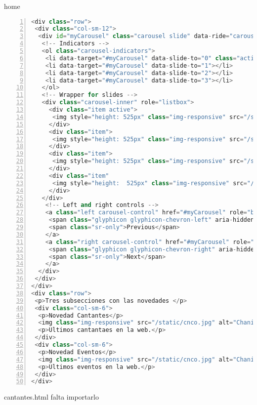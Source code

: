 home
\begin{lstlisting}[framerule=0pt,
aboveskip=0.5cm,
framextopmargin=3pt,
framexbottommargin=3pt,
framexleftmargin=0.4cm,
framesep=0pt,
rulesep=.4pt,
numbers=left,
numbersep=15pt,
numberstyle=\tiny,
numberfirstline = false,
breaklines=true,
frame=single,
stringstyle=\ttfamily,
showstringspaces = false,
basicstyle=\small\ttfamily,
keywordstyle=\bfseries,
rulesepcolor=\color{black},
captionpos=b,
language=Python,
caption=Home formato HTML.]
<div class="row">
 <div class="col-sm-12">
  <div id="myCarousel" class="carousel slide" data-ride="carousel">
   <!-- Indicators -->
   <ol class="carousel-indicators">
    <li data-target="#myCarousel" data-slide-to="0" class="active"></li>
    <li data-target="#myCarousel" data-slide-to="1"></li>
    <li data-target="#myCarousel" data-slide-to="2"></li>
    <li data-target="#myCarousel" data-slide-to="3"></li>
   </ol>
   <!-- Wrapper for slides -->
   <div class="carousel-inner" role="listbox">
     <div class="item active">
      <img style="height: 525px" class="img-responsive" src="/static/chris.jpg" alt="Chania">
     </div>
     <div class="item">
      <img style="height: 525px" class="img-responsive" src="/static/cnco.jpg" alt="Chania">
     </div>
     <div class="item">
      <img style="height: 525px" class="img-responsive" src="/static/DREAMBEACH.jpg" alt="Flower">
     </div>
     <div class="item"
      <img style="height:  525px" class="img-responsive" src="/static/ultra-music-festival.jpg" alt="Flower">
     </div>
   </div>
  	<!-- Left and right controls -->
    <a class="left carousel-control" href="#myCarousel" role="button" data-slide="prev">
     <span class="glyphicon glyphicon-chevron-left" aria-hidden="true"></span>
     <span class="sr-only">Previous</span>
    </a>
    <a class="right carousel-control" href="#myCarousel" role="button" data-slide="next">
     <span class="glyphicon glyphicon-chevron-right" aria-hidden="true"></span>
     <span class="sr-only">Next</span>
    </a>
  </div>
 </div>
</div>
<div class="row">
 <p>Tres subsecciones con las novedades </p>	
 <div class="col-sm-6">
  <p>Novedad Cantantes</p>
  <img class="img-responsive" src="/static/cnco.jpg" alt="Chania">
  <p>Ultimos cantantaes en la web.</p>
 </div>
 <div class="col-sm-6">
  <p>Novedad Eventos</p>
  <img class="img-responsive" src="/static/cnco.jpg" alt="Chania">
  <p>Ultimos eventos en la web.</p>
 </div>
</div>
\end{lstlisting}

cantantes.html
falta importarlo

